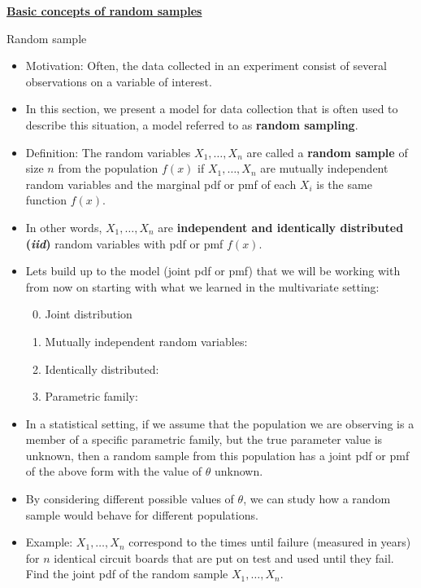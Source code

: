 \documentclass{article}
\newcommand{\bu}[1]{\textbf{\ul{#1}}}				%
\newcommand{\vecn}[2]{#1_1, \ldots, #1_{#2}}	%
\begin{document}
\newpage

\bu{Basic concepts of random samples}\bigskip

Random sample\bigskip
\begin{itemize}
    \item Motivation: Often, the data collected in an experiment consist of several observations on a variable of interest.
    \item[] In this section, we present a model for data collection that is often used to describe this situation, a model referred to as \textbf{random sampling}. 
    \item Definition: The random variables $\vecn{X}{n}$ are called a \textbf{random sample} of size $n$ from the population $f(x)$ if $\vecn{X}{n}$ are mutually independent random variables and the marginal pdf or pmf of each $X_i$ is the same function $f(x)$.
    \item[] In other words, $\vecn{X}{n}$ are \textbf{independent and identically distributed (\textit{iid})} random variables with pdf or pmf $f(x)$.\vspace{30pt}
    \item Lets build up to the model (joint pdf or pmf) that we will be working with from now on starting with what we learned in the multivariate setting:
    \begin{enumerate}\setcounter{enumi}{-1}
        \item Joint distribution\vspace{20pt}
        \item Mutually independent random variables:\vspace{30pt}
        \item Identically distributed:\vspace{30pt}
        \item Parametric family:\vspace{45pt}
    \end{enumerate}\bigskip
    \item In a statistical setting, if we assume that the population we are observing is a member of a specific parametric family, but the true parameter value is unknown, then a random sample from this population has a joint pdf or pmf of the above form with the value of $\theta$ unknown.
    \item[] By considering different possible values of $\theta$, we can study how a random sample would behave for different populations.
    \item Example: $\vecn{X}{n}$ correspond to the times until failure (measured in years) for $n$ identical circuit boards that are put on test and used until they fail. Find the joint pdf of the random sample $\vecn{X}{n}$.\vspace{50pt}
\end{itemize}\bigskip
\end{document}
